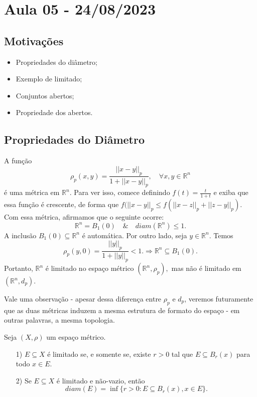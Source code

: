 \documentclass[metric_notes.tex]{subfiles}
\begin{document}
\section{Aula 05 - 24/08/2023}
\subsection{Motivações}
\begin{itemize}
	\item Propriedades do diâmetro;
	\item Exemplo de limitado;
	\item Conjuntos abertos;
	\item Propriedade dos abertos.
\end{itemize}
\subsection{Propriedades do Diâmetro}
\begin{example}
	A função
	\[
		\rho_{p}(x,y) = \frac{||x-y||_{p}}{1+||x-y||_{p}},\quad \forall x, y\in \mathbb{R}^{n}
	\]
	é uma métrica em \(\mathbb{R}^{n}\). Para ver isso, comece definindo \(f(t) = \frac{t}{1+t}\) e exiba que essa função é
	crescente, de forma que \(f(||x-y||_{p}\leq f(||x-z||_{p}+||z-y||_{p})\). Com essa métrica, afirmamos que o seguinte ocorre:
	\[
		\mathbb{R}^{n} = B_{1}(0)\quad\&\quad diam(\mathbb{R}^{n})\leq 1.
	\]
	A inclusão \(B_{1}(0)\subseteq{\mathbb{R}^{n}}\) é automática. Por outro lado, seja \(y\in \mathbb{R}^{n}.\) Temos
	\[
		\rho_{p}(y, 0) = \frac{||y||_{p}}{1 + ||y||_{p}} < 1. \Rightarrow \mathbb{R}^{n}\subseteq{B_{1}(0)}.
	\]
	Portanto, \(\mathbb{R}^{n}\) é limitado no espaço métrico \((\mathbb{R}^{n}, \rho_{p}),\) mas não é limitado em \((\mathbb{R}^{n}, d_{p})\).
\end{example}
Vale uma observação - apesar dessa diferença entre \(\rho_{p}\) e \(d_{p}\), veremos futuramente que as duas métricas induzem a mesma
estrutura de formato do espaço - em outras palavras, a mesma topologia.
\begin{prop*}
	Seja \((X, \rho )\) um espaço métrico.
	\begin{itemize}
		\item[1)] \(E\subseteq{X}\) é limitado se, e somente se, existe \(r>0\) tal que \(E\subseteq{B_{r}(x)}\) para todo \(x\in E\).
		\item[2)] Se \(E\subseteq{X}\) é limitado e não-vazio, então
		      \[
			      diam(E) = \inf\{r > 0: E \subseteq{B_{r}(x)}, x \in E\}.
		      \]
	\end{itemize}
\end{prop*}
\end{document}

